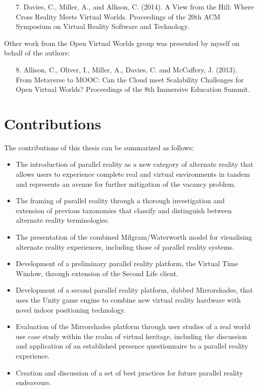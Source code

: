 \begin{itemize}
	\item [7.] Davies, C., Miller, A., and Allison, C. (2014). A View from the Hill: Where Cross Reality Meets Virtual Worlds.  Proceedings of the 20th ACM Symposium on Virtual Reality Software and Technology.	
\end{itemize}


Other work from the Open Virtual Worlds group was presented by myself on behalf of the authors:

\begin{itemize}
	
	\item [8.] Allison, C., Oliver, I., Miller, A., Davies, C. and McCaffery, J. (2013). From Metaverse to MOOC: Can the Cloud meet Scalability Challenges for Open Virtual Worlds? Proceedings of the 8th Immersive Education Summit.
	
\end{itemize}



\section{Contributions}
\label{intro-contributions}
The contributions of this thesis can be summarized as follows:

\begin{itemize}
	\item The introduction of parallel reality as a new category of alternate reality that allows users to experience complete real and virtual environments in tandem and represents an avenue for further mitigation of the vacancy problem.
	\item The framing of parallel reality through a thorough investigation and extension of previous taxonomies that classify and distinguish between alternate reality terminologies.
	\item The presentation of the combined Milgram/Waterworth model for visualising alternate reality experiences, including those of parallel reality systems.
	\item Development of a preliminary parallel reality platform, the Virtual Time Window, through extension of the Second Life client.
	\item Development of a second parallel reality platform, dubbed Mirrorshades, that uses the Unity game engine to combine new virtual reality hardware with novel indoor positioning technology.
	\item Evaluation of the Mirrorshades platform through user studies of a real world use case study within the realm of virtual heritage, including the discussion and application of an established presence questionnaire to a parallel reality experience.
	\item Creation and discussion of a set of best practices for future parallel reality endeavours.
\end{itemize}

